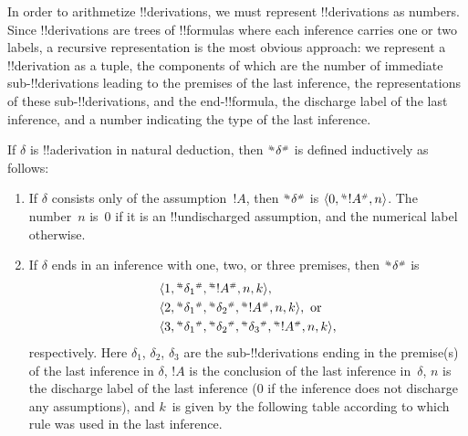 \documentclass[../../../include/open-logic-section]{subfiles}
\begin{document}

\begin{explain}
In order to arithmetize !!{derivation}s, we must represent
!!{derivation}s as numbers. Since !!{derivation}s are trees of
!!{formula}s where each inference carries one or two labels, a
recursive representation is the most obvious approach: we represent a
!!{derivation} as a tuple, the components of which are the number of
immediate sub-!!{derivation}s leading to the premises of the last
inference, the representations of these sub-!!{derivation}s, and the
end-!!{formula}, the discharge label of the last inference, and a
number indicating the type of the last inference.
\end{explain}

\begin{defn}
  If $\delta$ is !!a{derivation} in natural deduction, then $\Gn{\delta}$ is
  defined inductively as follows:
  \begin{enumerate}
  \item 
    If $\delta$ consists only of the assumption~$!A$, then $\Gn{\delta}$
    is $\tuple{0, \Gn{!A}, n}$. The number~$n$ is~$0$ if it is an
    !!{undischarged} assumption, and the numerical label otherwise.
  \item 
    If $\delta$ ends in an inference with one, two, or three premises,
    then $\Gn{\delta}$ is
    \begin{align*}
      & \tuple{1, \Gn{\delta_1}, \Gn{!A}, n, k}, \\
      & \tuple{2, \Gn{\delta_1}, \Gn{\delta_2}, \Gn{!A}, n, k}, \text{ or}\\
      & \tuple{3, \Gn{\delta_1}, \Gn{\delta_2}, \Gn{\delta_3}, \Gn{!A}, n,
        k},
    \end{align*}
    respectively.  Here $\delta_1$, $\delta_2$, $\delta_3$ are the
    sub-!!{derivation}s ending in the premise(s) of the last inference
    in $\delta$, $!A$ is the conclusion of the last inference
    in~$\delta$, $n$ is the discharge label of the last inference ($0$
    if the inference does not discharge any assumptions), and $k$~is
    given by the following table according to which rule was used in the
    last inference.
  

\end{enumerate}
\end{defn}
\end{document}
